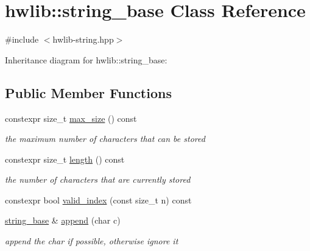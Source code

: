\hypertarget{classhwlib_1_1string__base}{}\section{hwlib\+:\+:string\+\_\+base Class Reference}
\label{classhwlib_1_1string__base}


{\ttfamily \#include $<$hwlib-\/string.\+hpp$>$}



Inheritance diagram for hwlib\+:\+:string\+\_\+base\+:
\subsection*{Public Member Functions}
\begin{DoxyCompactItemize}
\item 
\mbox{\label{classhwlib_1_1string__base_ac5a476ab1d71e29767726cb315e84864}} 
constexpr size\+\_\+t \hyperlink{classhwlib_1_1string__base_ac5a476ab1d71e29767726cb315e84864}{max\+\_\+size} () const
\begin{DoxyCompactList}\small\item\em the maximum number of characters that can be stored \end{DoxyCompactList}\item 
\mbox{\label{classhwlib_1_1string__base_aee4b9a128b0088306c7be6bed550ce4b}} 
constexpr size\+\_\+t \hyperlink{classhwlib_1_1string__base_aee4b9a128b0088306c7be6bed550ce4b}{length} () const
\begin{DoxyCompactList}\small\item\em the number of characters that are currently stored \end{DoxyCompactList}\item 
constexpr bool \hyperlink{classhwlib_1_1string__base_ac643906a4a4e6ff3ac680eb704ce7506}{valid\+\_\+index} (const size\+\_\+t n) const
\item 
\mbox{\label{classhwlib_1_1string__base_aaa29fb7750163df307bb0a3197bd233e}} 
\hyperlink{classhwlib_1_1string__base}{string\+\_\+base} \& \hyperlink{classhwlib_1_1string__base_aaa29fb7750163df307bb0a3197bd233e}{append} (char c)
\begin{DoxyCompactList}\small\item\em append the char if possible, otherwise ignore it \end{DoxyCompactList}\item 

\end{DoxyCompactItemize}
